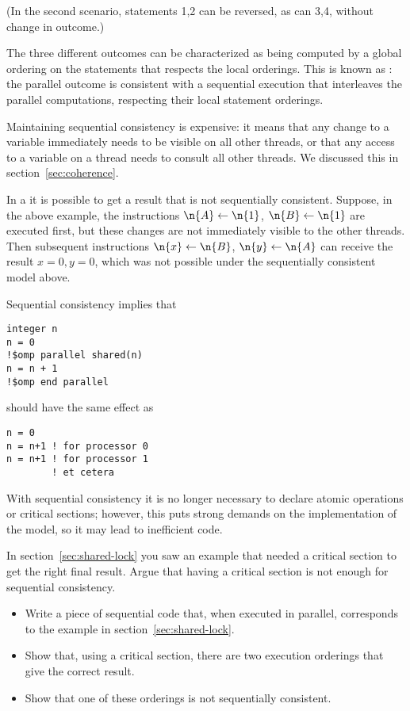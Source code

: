 (In the second scenario, statements 1,2 can be reversed, as can 3,4,
without change in outcome.)

The three different outcomes can be characterized as being computed by a global ordering
on the statements that respects the local orderings. This is known as : the parallel outcome is consistent with a sequential execution that
interleaves the parallel computations, respecting their local statement orderings.

Maintaining sequential consistency is expensive: it means that any change to a variable
immediately needs to be visible on all other threads, or that any access to a variable
on a thread
needs to consult all other threads. We discussed this in section~\ref{sec:coherence}.

In a  it is possible to get a result that
is not sequentially consistent. Suppose, in the above example, the instructions
$\n{A}\leftarrow \n{1}$, $\n{B}\leftarrow \n{1}$ are executed first, but
these changes are not immediately visible to the other threads.
Then subsequent instructions
$\n{x}\leftarrow \n{B}$, $\n{y}\leftarrow \n{A}$  can receive the
result $x=0,y=0$, which was not possible under the sequentially consistent
model above.

Sequential consistency implies that
\begin{verbatim}
integer n
n = 0
!$omp parallel shared(n)
n = n + 1
!$omp end parallel
\end{verbatim}
should have the same effect as
\begin{verbatim}
n = 0
n = n+1 ! for processor 0
n = n+1 ! for processor 1
        ! et cetera
\end{verbatim}
With sequential consistency it is no longer necessary to declare
atomic operations or critical sections; however, this puts strong
demands on the implementation of the model, so it may lead to
inefficient code.

\begin{exercise}
  In section~\ref{sec:shared-lock} you saw an example that needed
  a critical section to get the right final result. Argue that
  having a critical section is not enough for sequential consistency.
  \begin{itemize}
  \item Write a piece of sequential code that, when executed in parallel,
    corresponds to the example in section~\ref{sec:shared-lock}.
  \item Show that, using a critical section, there are two execution
    orderings that give the correct result.
  \item Show that one of these orderings is not sequentially consistent.
  \end{itemize}
\end{exercise}

